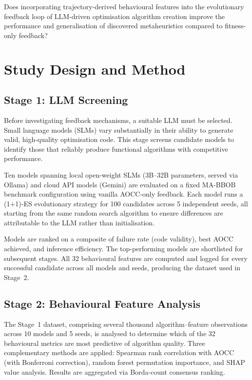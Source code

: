 \documentclass[12pt]{article}
\begin{document}
Does incorporating trajectory-derived behavioural features into the evolutionary feedback loop of LLM-driven optimisation algorithm creation improve the performance and generalisation of discovered metaheuristics compared to fitness-only feedback?

\section{Study Design and Method}

\subsection{Stage 1: LLM Screening}

Before investigating feedback mechanisms, a suitable LLM must be selected. Small language models (SLMs) vary substantially in their ability to generate valid, high-quality optimisation code. This stage screens candidate models to identify those that reliably produce functional algorithms with competitive performance.

Ten models spanning local open-weight SLMs (3B--32B parameters, served via Ollama) and cloud API models (Gemini) are evaluated on a fixed MA-BBOB \cite{vermetten2023mabbob} benchmark configuration using vanilla AOCC-only feedback. Each model runs a (1+1)-ES evolutionary strategy for 100 candidates across 5 independent seeds, all starting from the same random search algorithm to ensure differences are attributable to the LLM rather than initialisation.

Models are ranked on a composite of failure rate (code validity), best AOCC achieved, and inference efficiency. The top-performing models are shortlisted for subsequent stages. All 32 behavioural features are computed and logged for every successful candidate across all models and seeds, producing the dataset used in Stage~2.

\subsection{Stage 2: Behavioural Feature Analysis}

The Stage~1 dataset, comprising several thousand algorithm--feature observations across 10 models and 5 seeds, is analysed to determine which of the 32 behavioural metrics are most predictive of algorithm quality. Three complementary methods are applied: Spearman rank correlation with AOCC (with Bonferroni correction), random forest permutation importance, and SHAP value analysis. Results are aggregated via Borda-count consensus ranking.
\end{document}
